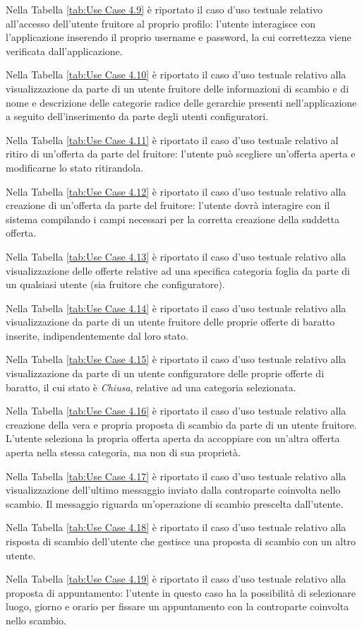Nella Tabella \ref{tab:Use Case 4.9} è riportato il caso d'uso testuale relativo all'accesso dell'utente fruitore al proprio profilo: l'utente interagisce con l'applicazione inserendo il proprio username e password, la cui correttezza viene verificata dall'applicazione.\bigskip

Nella Tabella \ref{tab:Use Case 4.10} è riportato il caso d'uso testuale relativo alla visualizzazione da parte di un utente fruitore delle informazioni di scambio e di nome e descrizione delle categorie radice delle gerarchie presenti nell'applicazione a seguito dell'inserimento da parte degli utenti configuratori.\bigskip

Nella Tabella \ref{tab:Use Case 4.11} è riportato il caso d'uso testuale relativo al ritiro di un'offerta da parte del fruitore: l'utente può scegliere un'offerta aperta e modificarne lo stato ritirandola.\bigskip

Nella Tabella \ref{tab:Use Case 4.12} è riportato il caso d'uso testuale relativo alla creazione di un'offerta da parte del fruitore: l'utente dovrà interagire con il sistema compilando i campi necessari per la corretta creazione della suddetta offerta.\bigskip

Nella Tabella \ref{tab:Use Case 4.13} è riportato il caso d'uso testuale relativo alla visualizzazione delle offerte relative ad una specifica categoria foglia da parte di un qualsiasi utente (sia fruitore che configuratore).\bigskip

Nella Tabella \ref{tab:Use Case 4.14} è riportato il caso d'uso testuale relativo alla visualizzazione da parte di un utente fruitore delle proprie offerte di baratto inserite, indipendentemente dal loro stato.\bigskip

Nella Tabella \ref{tab:Use Case 4.15} è riportato il caso d'uso testuale relativo alla visualizzazione da parte di un utente configuratore delle proprie offerte di baratto, il cui stato è \textit{Chiusa}, relative ad una categoria selezionata.\bigskip

Nella Tabella \ref{tab:Use Case 4.16} è riportato il caso d'uso testuale relativo alla creazione della vera e propria proposta di scambio da parte di un utente fruitore. L'utente seleziona la propria offerta aperta da accoppiare con un'altra offerta aperta nella stessa categoria, ma non di sua proprietà.\bigskip

Nella Tabella \ref{tab:Use Case 4.17} è riportato il caso d'uso testuale relativo alla visualizzazione dell'ultimo messaggio inviato dalla controparte coinvolta nello scambio. Il messaggio riguarda un'operazione di scambio prescelta dall'utente.\bigskip

Nella Tabella \ref{tab:Use Case 4.18} è riportato il caso d'uso testuale relativo alla risposta di scambio dell'utente che gestisce una proposta di scambio con un altro utente.\bigskip

Nella Tabella \ref{tab:Use Case 4.19} è riportato il caso d'uso testuale relativo alla proposta di appuntamento: l'utente in questo caso ha la possibilità di selezionare luogo, giorno e orario per fissare un appuntamento con la controparte coinvolta nello scambio.\bigskip 
